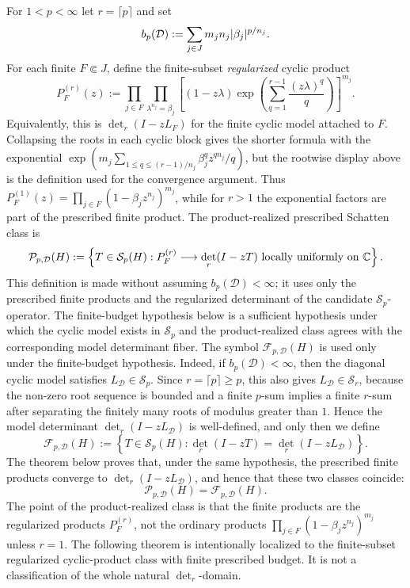 For \(1<p<\infty\) let \(r=\lceil p\rceil\) and set
\[
  b_p(\mathcal D):=\sum_{j\in J}m_j n_j\lvert \beta_j \rvert^{p/n_j}.
\]
For each finite \(F\Subset J\), define the finite-subset
\emph{regularized} cyclic product
\[
  P_F^{(r)}(z):=
  \prod_{j\in F}
  \prod_{\lambda^{n_j}=\beta_j}
  \left[
    (1-z\lambda)
    \exp\!\left(\sum_{q=1}^{r-1}\frac{(z\lambda)^q}{q}\right)
  \right]^{m_j}.
\]
Equivalently, this is \(\det_r(I-zL_F)\) for the finite cyclic model
attached to \(F\).  Collapsing the roots in each cyclic block gives the shorter
formula with the exponential
\(\exp(m_j\sum_{1\le q\le (r-1)/n_j}\beta_j^qz^{qn_j}/q)\), but the rootwise
display above is the definition used for the convergence argument.  Thus
\(P_F^{(1)}(z)=\prod_{j\in F}(1-\beta_jz^{n_j})^{m_j}\), while for
\(r>1\) the exponential factors are part of the prescribed finite product.
The product-realized prescribed Schatten class is
\[
  \mathcal P_{p,\mathcal D}(H)
  :=\left\{T\in\mathcal S_p(H):
  P_F^{(r)}\longrightarrow \det_r(I-zT)
  \text{ locally uniformly on }\mathbb{C}\right\}.
\]
This definition is made without assuming \(b_p(\mathcal D)<\infty\); it uses
only the prescribed finite products and the regularized determinant of the
candidate \(\mathcal S_p\)-operator.  The finite-budget hypothesis below is a
sufficient hypothesis under which the cyclic model exists in \(\mathcal S_p\)
and the product-realized class agrees with the corresponding model determinant
fiber.
The symbol \(\mathcal F_{p,\mathcal D}(H)\) is used only under the finite-budget
hypothesis.  Indeed, if \(b_p(\mathcal D)<\infty\), then the diagonal cyclic
model satisfies \(L_{\mathcal D}\in\mathcal S_p\).  Since
\(r=\lceil p\rceil\ge p\), this also gives
\(L_{\mathcal D}\in\mathcal S_r\), because the non-zero root sequence is bounded
and a finite \(p\)-sum implies a finite \(r\)-sum after separating the finitely
many roots of modulus greater than \(1\).  Hence the model determinant
\(\det_r(I-zL_{\mathcal D})\) is well-defined, and only then we define
\[
  \mathcal F_{p,\mathcal D}(H)
  :=\left\{T\in\mathcal S_p(H):
  \det_r(I-zT)=\det_r(I-zL_{\mathcal D})\right\}.
\]
The theorem below proves that, under the same hypothesis, the prescribed finite
products converge to \(\det_r(I-zL_{\mathcal D})\), and hence that these two
classes coincide:
\[
  \mathcal P_{p,\mathcal D}(H)=\mathcal F_{p,\mathcal D}(H).
\]
The point of the product-realized class is that the finite products are the
regularized products \(P_F^{(r)}\), not the ordinary products
\(\prod_{j\in F}(1-\beta_jz^{n_j})^{m_j}\) unless \(r=1\).
The following theorem is intentionally localized to the finite-subset
regularized cyclic-product class with finite prescribed budget.  It is not a
classification of the whole natural \(\det_r\)-domain.

